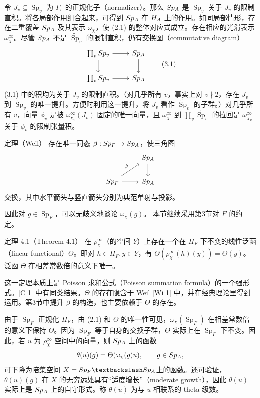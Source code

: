 令 $J_v\subseteq\operatorname{Sp}_v$ 为 $\Gamma_v$ 的正规化子（normalizer）。那么 $Sp_A$ 是 $\operatorname{Sp}_v$ 关于 $J_v$ 的限制直积。将各局部作用组合起来，可得到 $Sp_A$ 在 $H_A$ 上的作用。如同局部情形，存在二重覆盖 $Sp_A$ 及其表示 $\omega_\chi$，使 (2.1) 的整体对应式成立。存在相应的光滑表示 $\omega_\chi^\infty$。尽管 $Sp_A$ 不是 $\widetilde{\operatorname{Sp}}_v$ 的限制直积，仍有交换图（commutative diagram）
\[
\begin{tikzcd}
\prod_v\widetilde{\operatorname{Sp}}_v\arrow[r]\arrow[d]&\widetilde{\operatorname{Sp}}_\A\arrow[d]\\
\prod_v\operatorname{Sp}_v\arrow[r]&\operatorname{Sp}_\A
\end{tikzcd}\tag{3.1}
\]
(3.1) 中的积均为关于 $J_v$ 的限制直积。（对几乎所有 $v$，事实上对 $v\nmid2$，存在 $J_v$ 到 $\widetilde{\operatorname{Sp}}_v$ 的唯一提升。方便时利用这一提升，将 $J_v$ 看作 $\widetilde{\operatorname{Sp}}_v$ 的子群。）对几乎所有 $v$，向量 $\phi_v$ 是被 $\omega_{\chi_v}^\infty(J_v)$ 固定的唯一向量，且 $\omega_\chi^\infty$ 到 $\prod_v\widetilde{\operatorname{Sp}}_v$ 的拉回是 $\omega_{\chi_v}^\infty$ 关于 $\phi_v$ 的限制张量积。
\begin{originaltheorem}{定理（Weil）}
存在唯一同态 $\beta:Sp_F\to Sp_A$，使三角图
\[
\begin{tikzcd}
&\widetilde{\operatorname{Sp}}_\A\arrow[d]\\
\operatorname{Sp}_F\arrow[ur,"\beta"]\arrow[r]&\operatorname{Sp}_\A
\end{tikzcd}
\]
交换，其中水平箭头与竖直箭头分别为典范单射与投影。
\end{originaltheorem}
因此对 $g\in\operatorname{Sp}_F$，可以无歧义地谈论 $\omega_\chi(g)$。
本节继续采用第3节对 $F$ 的约定。
\begin{originaltheorem}{定理 4.1（Theorem 4.1）}
在 $\rho_\chi^\infty$（的空间 $Y$）上存在一个在 $H_F$ 下不变的线性泛函（linear functional）$\Theta$。即对 $h\in H_F,y\in Y$，有 $\Theta(\rho_\chi^\infty(h)(y))=\Theta(y)$。泛函 $\Theta$ 在相差常数倍的意义下唯一。
\end{originaltheorem}
这一定理本质上是 Poisson 求和公式（Poisson summation formula）的一个强形式。[C 1] 中有同类结果。$\Theta$ 的存在隐含于 Weil [Wi 1] 中，并在经典理论里得到运用。第3节中提升 $\beta$ 的构造，也主要依赖于 $\Theta$ 的存在。

由于 $\operatorname{Sp}_F$ 正规化 $H_F$，由 (2.1) 和 $\Theta$ 的唯一性可见，$\omega_\chi(\operatorname{Sp}_F)$ 在相差常数倍的意义下保持 $\Theta$。因为 $\operatorname{Sp}_F$ 等于自身的交换子群，$\Theta$ 实际上在 $\operatorname{Sp}_F$ 下不变。因此，若 $u$ 为 $\rho_\chi^\infty$ 空间中的向量，则 $Sp_A$ 上的函数
\[
\theta(u)(g)=\Theta(\omega_\chi(g)u),\qquad g\in Sp_A,
\]
可下降为陪集空间 $X=\operatorname{Sp}_F\backslash\widetilde{\operatorname{Sp}}_\A$上的函数。还可验证，$\theta(u)(g)$ 在 $X$ 的无穷远处具有“适度增长”（moderate growth），因此 $\theta(u)$ 实际上是 $Sp_A$ 上的自守形式。称 $\theta(u)$ 为与 $u$ 相联系的 theta 级数。

